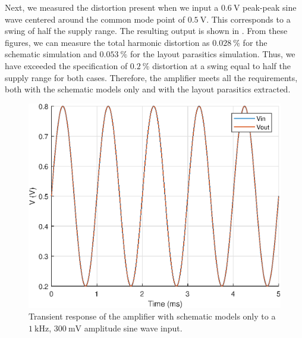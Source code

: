 \documentclass[journal,hidelinks]{IEEEtran}
\begin{document}
Next, we measured the distortion present when we input a $\SI{0.6}{\volt}$ peak-peak sine wave centered around the common mode point of $\SI{0.5}{\volt}$. This corresponds to a swing of half the supply range. The resulting output is shown in . From these figures, we can measure the total harmonic distortion as $\SI{0.028}{\percent}$ for the schematic simulation and $\SI{0.053}{\percent}$ for the layout parasitics simulation. Thus, we have exceeded the specification of $\SI{0.2}{\percent}$ distortion at a swing equal to half the supply range for both cases. Therefore, the amplifier meets all the requirements, both with the schematic models only and with the layout parasitics extracted.

\begin{figure}[!htb]
  \centering
  \includegraphics[width=\columnwidth]{figures/schematic/tran_3m.eps}
  \caption{Transient response of the amplifier with schematic models only to a $\SI{1}{\kilo\hertz}$, $\SI{300}{\milli\volt}$ amplitude sine wave input.}
  \label{fig:sch_tran_3m}
\end{figure}
\end{document}
